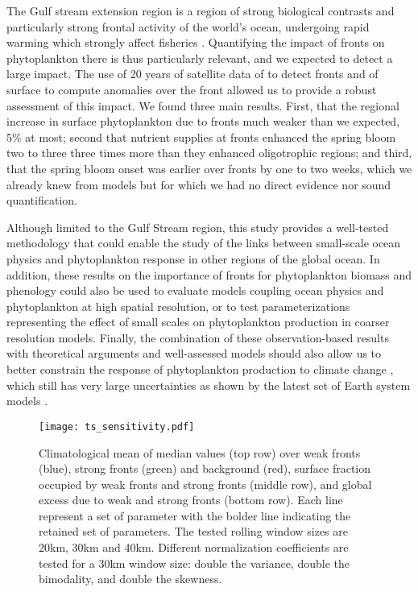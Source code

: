 \conclusions{}

The Gulf stream extension region is a region of strong biological contrasts and particularly strong frontal activity of the world's ocean, undergoing rapid warming which strongly affect fisheries \parencite{pershing_2015, neto_2021}.
Quantifying the impact of fronts on phytoplankton there is thus particularly relevant, and we expected to detect a large impact.
The use of 20 years of satellite data of  to detect fronts and of surface  to compute anomalies over the front allowed us to provide a robust assessment of this impact.
We found three main results.
First, that the regional increase in surface phytoplankton due to fronts much weaker than we expected, 5\% at most; second that nutrient supplies at fronts enhanced the spring bloom two to three three times more than they enhanced oligotrophic regions; and third, that the spring bloom onset was earlier over fronts by one to two weeks, which we already knew from models \parencite{karleskind_2011, mahadevan_2012} but for which we had no direct evidence nor sound quantification.

Although limited to the Gulf Stream region, this study provides a well-tested methodology that could enable the study of the links between small-scale ocean physics and phytoplankton response in other regions of the global ocean.
In addition, these results on the importance of fronts for phytoplankton biomass and phenology could also be used to evaluate models coupling ocean physics and phytoplankton at high spatial resolution, or to test parameterizations representing the effect of small scales on phytoplankton production in coarser resolution models.
Finally, the combination of these observation-based results with theoretical arguments and well-assessed models should also allow us to better constrain the response of phytoplankton production to climate change \parencite{couespel_2021}, which still has very large uncertainties as shown by the latest set of Earth system models \citep{kwiatkowski_2020}.



\appendixfigures{}

\begin{figure*}
 \texttt{[image: ts\_sensitivity.pdf]}
 \caption{
   Climatological mean of  median values (top row) over weak fronts (blue), strong fronts (green) and background (red), surface fraction occupied by weak fronts and strong fronts (middle row), and global  excess due to weak and strong fronts (bottom row).
   Each line represent a set of parameter with the bolder line indicating the retained set of parameters.
   The tested rolling window sizes are 20km, 30km and 40km.
   Different normalization coefficients are tested for a 30km window size: double the variance, double the bimodality, and double the skewness.
 }%
 \label{fig:ts-sensitivity}
\end{figure*}


